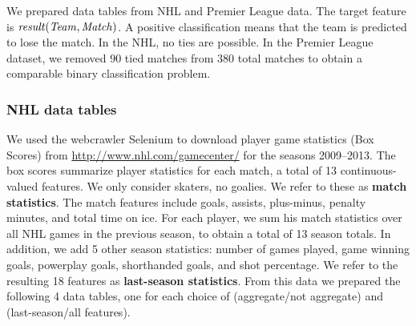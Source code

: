 \documentclass[conference]{IEEEtran}
\begin{document}


We prepared data tables from NHL and Premier League data. The target feature is $\it{result(Team,Match)}$. A positive classification means that the team is predicted to lose the match. In the NHL, no ties are possible. In the Premier League dataset, we removed 90 tied matches from 380 total matches to obtain a comparable binary classification problem.

\subsubsection{NHL data tables}

We used the webcrawler Selenium \cite{bib:crawler} to download player game statistics (Box Scores) from \url{http://www.nhl.com/gamecenter/} for the seasons 2009--2013. The box scores summarize player statistics for each match, a total of 13 continuous-valued features. We only consider skaters, no goalies. We refer to these as \textbf{match statistics}. The match features include goals, assists, plus-minus, penalty minutes, and total time on ice. For each player, we sum his match statistics over all NHL games in the previous season, to obtain a total of 13 season totals. In addition, we add 5 other season statistics: number of games played, game winning goals, powerplay goals, shorthanded goals, and shot percentage. We refer to the resulting 18 features as \textbf{last-season statistics}. From this data we prepared the following 4 data tables, one for each choice of (aggregate/not aggregate) and (last-season/all features).
\end{document}

